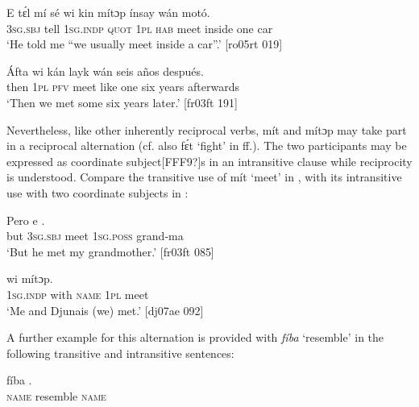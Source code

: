 \ea%
    \label{ex:key:1313}
    \gll E    tɛ́l  mí    sé    wi  kin  mítɔp  ínsay  wán    motó.\\
\textsc{3sg.sbj}  tell  \textsc{1sg.indp}  \textsc{quot}    \textsc{1pl}  \textsc{hab}  meet  inside  one    car\\

\glt ‘He told me “we usually meet inside a car”.’ [ro05rt 019]
\z


\ea%
    \label{ex:key:1314}
    \gll \'{A}fta    wi  kán      layk    wán  seis    años  después.\\
then  \textsc{1pl}  \textsc{pfv}  meet  like    one  six    years  afterwards\\

\glt ‘Then we met some six years later.’ [fr03ft 191]
\z

Nevertheless, like other inherently reciprocal verbs, mít and mítɔp may take part in a reciprocal alternation (cf. also fɛ́t ‘fight’ in ff.). The two participants may be expressed as coordinate subject[FFF9?]s in an intransitive clause while reciprocity is understood. Compare the transitive use of mít ‘meet’ in , with its intransitive use with two coordinate subjects in :


\ea%
    \label{ex:key:1315}
    \gll Pero    e            .\\
but    \textsc{3sg.sbj}  meet  \textsc{1sg.poss}  grand-ma\\

\glt ‘But he met my grandmother.’ [fr03ft 085]
\z


\ea%
    \label{ex:key:1316}
    \gll {}          wi  mítɔp.\\
\textsc{1sg.indp}  with    \textsc{name}  \textsc{1pl}  meet\\

\glt ‘Me and Djunais (we) met.’ [dj07ae 092]
\z

A further example for this alternation is provided with \textit{fíba} ‘resemble’ in the following transitive and intransitive sentences:


\ea%
    \label{ex:key:1317}
    \gll {}  fíba      .\\
\textsc{name}  resemble    \textsc{name}\\

